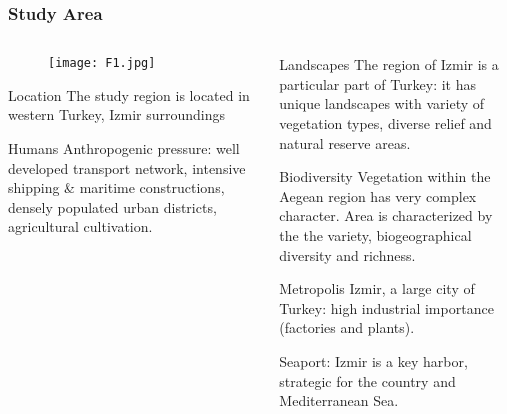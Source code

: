 \documentclass[pdflatex,compress,8pt,
	xcolor={dvipsnames,dvipsnames,svgnames,x11names,table},
	hyperref={colorlinks = true,
	breaklinks = true, 
	urlcolor = NavyBlue, 
	breaklinks = true}]{beamer}
\begin{document}
\begin{frame}\frametitle{Study Area}
\begin{minipage}[0.4\textheight]{\textwidth}
\begin{columns}[T]
\begin{column}{0.5\textwidth}
\vspace{1em}
\begin{figure}[H]
	\centering
		\texttt{[image: F1.jpg]}
\end{figure}

\begin{alertblock}{Location}
The study region is located in western Turkey, Izmir surroundings
\end{alertblock}

\begin{block}{Humans}
Anthropogenic pressure: well developed transport network, intensive shipping \& maritime constructions, densely populated urban districts, agricultural cultivation.
\end{block}

\end{column}
\begin{column}{0.5\textwidth}
\vspace{1em} 

\begin{alertblock}{Landscapes}
The region of Izmir is a particular part of Turkey: it has unique landscapes with variety of vegetation types, diverse relief and natural reserve areas.
\end{alertblock}

\begin{block}{Biodiversity}
Vegetation within the Aegean region has very complex character. Area is characterized by the the variety, biogeographical diversity and richness.
\end{block}

\begin{block}{Metropolis}
Izmir, a  large city of Turkey: high industrial importance (factories and plants).
\end{block}

\begin{examples}{Seaport:}
Izmir is a key harbor, strategic for the country and Mediterranean Sea.
\end{examples}

\end{column}
\end{columns}
\end{minipage}
\end{frame}
\end{document}
